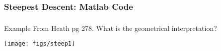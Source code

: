 \documentclass[xcolor=dvipsnames,11pt]{beamer}
\begin{document}
%	
%	
%	
%	
%	
%	
%	
%	
%	
%	


\subsubsection{Steepest Descent: Matlab Code}

\begin{frame}
\frametitle{\subsubsecname}

\vspace{-3pt}	


\end{frame}

\begin{frame}{Example}
From Heath pg 278. 	What is the geometrical interpretation?
\vspace{-3pt}
	\begin{center}
		\texttt{[image: figs/steep1]}
	\end{center}

\end{frame}
\end{document}
